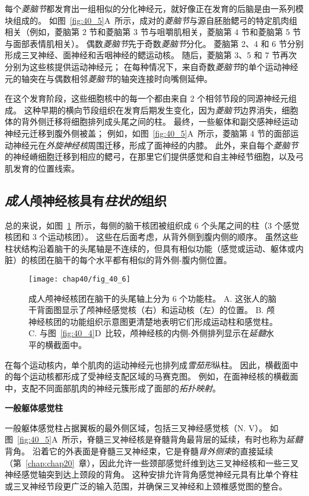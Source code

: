 每个\textit{菱脑节}都发育出一组相似的分化神经元，就好像正在发育的后脑是由一系列模块组成的。
如图~\ref{fig:40_5}A~所示，成对的\textit{菱脑节}与源自胚胎鳃弓的特定肌肉组相关（例如，菱脑第 2 节和菱脑第 3 节与咀嚼肌相关，菱脑第 4 节和菱脑第 5 节与面部表情肌相关）。
偶数\textit{菱脑节}先于奇数\textit{菱脑节}分化。
菱脑第 2、4 和 6 节分别形成三叉神经、面神经和舌咽神经的鳃运动核。
随后，菱脑第 3、5 和 7 节再次分别为这些核提供运动神经元；
在每种情况下，来自奇数\textit{菱脑节}的单个运动神经元的轴突在与偶数相邻\textit{菱脑节}的轴突连接时向嘴侧延伸。


在这个发育阶段，这些细胞核中的每一个都由来自 2 个相邻节段的同源神经元组成。
这种早期的横向节段组织在发育后期发生变化，因为\textit{菱脑节}边界消失，细胞体的背外侧迁移将细胞排列成头尾之间的柱。
最终，一些躯体和副交感神经运动神经元迁移到腹外侧被盖；
例如，如图~\ref{fig:40_5}A~所示，菱脑第 4 节的面部运动神经元在\textit{外旋神经核}周围迁移，形成了面神经的内膝。
此外，来自每个\textit{菱脑节}的神经嵴细胞迁移到相应的鳃弓，在那里它们提供感觉和自主神经节细胞，以及弓肌发育的位置线索。



\subsection{\textit{成人}颅神经核具有\textit{柱状的}组织}

总的来说，如图~\ref{fig:40_6}~所示，每侧的脑干核团被组织成 6 个头尾之间的柱（3 个感觉核团和 3 个运动核团）。
这些在后面考虑，从背外侧到腹内侧的顺序。
虽然这些柱状结构沿着脑干的头尾轴是不连续的，但具有相似功能（感觉或运动、躯体或内脏）的核团在脑干的每个水平都有相似的背外侧-腹内侧位置。


\begin{figure}[htbp]
	\centering
	\texttt{[image: chap40/fig\_40\_6]}
	\caption{成人颅神经核团在脑干的头尾轴上分为 6 个功能柱。
		A. 这张人的脑干背面图显示了颅神经感觉核（右）和运动核（左）的位置。
		B. 颅神经核团的功能组织示意图更清楚地表明它们形成运动柱和感觉柱。
		C. 与图~\ref{fig:40_4}D~比较，颅神经核的内侧-外侧排列显示在\textit{延髓}水平的横截面中。}
	\label{fig:40_6}
\end{figure}


在每个运动核内，单个肌肉的运动神经元也排列成\textit{雪茄形}纵柱。
因此，横截面中的每个运动核都形成了受神经支配区域的马赛克图。
例如，在面神经核的横截面中，支配不同面部肌肉的神经元簇形成了面部的\textit{拓扑映射}。


\textbf{一般躯体感觉柱}

一般躯体感觉柱占据翼板的最外侧区域，包括三叉神经感觉核（N. V）。
如图~\ref{fig:40_5}A~所示，脊髓三叉神经核是脊髓背角最背层的延续，有时也称为\textit{延髓}背角。
沿着它的外表面是脊髓三叉神经束，它是脊髓\textit{背外侧束}的直接延续（第~\ref{chap:chap20}~章），因此允许一些颈部感觉纤维到达三叉神经核和一些三叉神经感觉轴突到达上颈段的背角。
这种安排允许背角感觉神经元具有比单个脊柱或三叉神经节段更广泛的输入范围，并确保三叉神经和上颈椎感觉图的整合。


